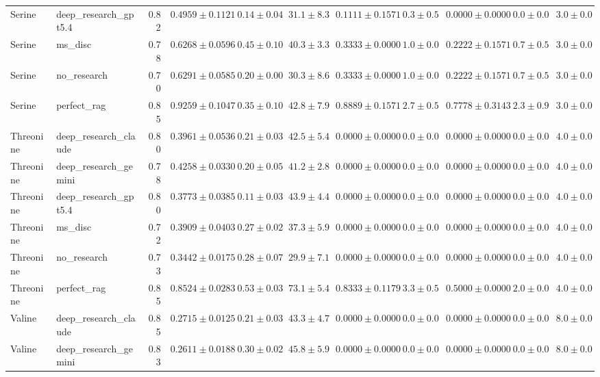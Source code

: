 \begin{table}[htbp]
\begin{tabular}{llrrrrrrrrr}
Serine & deep_research_gpt5.4 & 0.82 & \cellcolor{red!25}$0.4959 \pm 0.1121$ & $0.14 \pm 0.04$ & $31.1 \pm 8.3$ & $0.1111 \pm 0.1571$ & $0.3 \pm 0.5$ & $0.0000 \pm 0.0000$ & $0.0 \pm 0.0$ & $3.0 \pm 0.0$ \\
Serine & ms_disc & 0.78 & $0.6268 \pm 0.0596$ & $0.45 \pm 0.10$ & $40.3 \pm 3.3$ & $0.3333 \pm 0.0000$ & $1.0 \pm 0.0$ & $0.2222 \pm 0.1571$ & $0.7 \pm 0.5$ & $3.0 \pm 0.0$ \\
Serine & no_research & 0.70 & $0.6291 \pm 0.0585$ & $0.20 \pm 0.00$ & $30.3 \pm 8.6$ & $0.3333 \pm 0.0000$ & $1.0 \pm 0.0$ & $0.2222 \pm 0.1571$ & $0.7 \pm 0.5$ & $3.0 \pm 0.0$ \\
Serine & perfect_rag & 0.85 & \cellcolor{green!25}$0.9259 \pm 0.1047$ & $0.35 \pm 0.10$ & $42.8 \pm 7.9$ & $0.8889 \pm 0.1571$ & $2.7 \pm 0.5$ & $0.7778 \pm 0.3143$ & $2.3 \pm 0.9$ & $3.0 \pm 0.0$ \\
\midrule
Threonine & deep_research_claude & 0.80 & $0.3961 \pm 0.0536$ & $0.21 \pm 0.03$ & $42.5 \pm 5.4$ & $0.0000 \pm 0.0000$ & $0.0 \pm 0.0$ & $0.0000 \pm 0.0000$ & $0.0 \pm 0.0$ & $4.0 \pm 0.0$ \\
Threonine & deep_research_gemini & 0.78 & $0.4258 \pm 0.0330$ & $0.20 \pm 0.05$ & $41.2 \pm 2.8$ & $0.0000 \pm 0.0000$ & $0.0 \pm 0.0$ & $0.0000 \pm 0.0000$ & $0.0 \pm 0.0$ & $4.0 \pm 0.0$ \\
Threonine & deep_research_gpt5.4 & 0.80 & $0.3773 \pm 0.0385$ & $0.11 \pm 0.03$ & $43.9 \pm 4.4$ & $0.0000 \pm 0.0000$ & $0.0 \pm 0.0$ & $0.0000 \pm 0.0000$ & $0.0 \pm 0.0$ & $4.0 \pm 0.0$ \\
Threonine & ms_disc & 0.72 & $0.3909 \pm 0.0403$ & $0.27 \pm 0.02$ & $37.3 \pm 5.9$ & $0.0000 \pm 0.0000$ & $0.0 \pm 0.0$ & $0.0000 \pm 0.0000$ & $0.0 \pm 0.0$ & $4.0 \pm 0.0$ \\
Threonine & no_research & 0.73 & \cellcolor{red!25}$0.3442 \pm 0.0175$ & $0.28 \pm 0.07$ & $29.9 \pm 7.1$ & $0.0000 \pm 0.0000$ & $0.0 \pm 0.0$ & $0.0000 \pm 0.0000$ & $0.0 \pm 0.0$ & $4.0 \pm 0.0$ \\
Threonine & perfect_rag & 0.85 & \cellcolor{green!25}$0.8524 \pm 0.0283$ & $0.53 \pm 0.03$ & $73.1 \pm 5.4$ & $0.8333 \pm 0.1179$ & $3.3 \pm 0.5$ & $0.5000 \pm 0.0000$ & $2.0 \pm 0.0$ & $4.0 \pm 0.0$ \\
\midrule
Valine & deep_research_claude & 0.85 & $0.2715 \pm 0.0125$ & $0.21 \pm 0.03$ & $43.3 \pm 4.7$ & $0.0000 \pm 0.0000$ & $0.0 \pm 0.0$ & $0.0000 \pm 0.0000$ & $0.0 \pm 0.0$ & $8.0 \pm 0.0$ \\
Valine & deep_research_gemini & 0.83 & $0.2611 \pm 0.0188$ & $0.30 \pm 0.02$ & $45.8 \pm 5.9$ & $0.0000 \pm 0.0000$ & $0.0 \pm 0.0$ & $0.0000 \pm 0.0000$ & $0.0 \pm 0.0$ & $8.0 \pm 0.0$ \\

\end{tabular}
\end{table}
